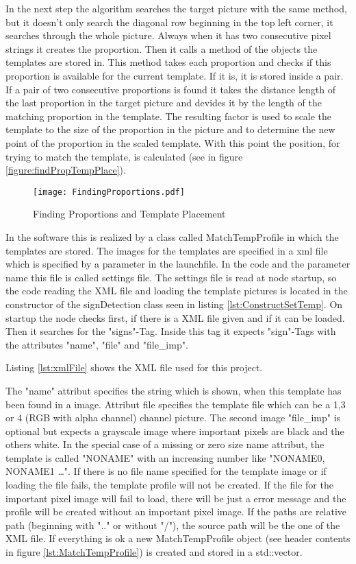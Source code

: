In the next step the algorithm searches the target picture with the same method, but
it doesn't only search the diagonal row beginning in the top left corner, it searches
through the whole picture. Always when it has two consecutive pixel strings it
creates the proportion. Then it calls a method of the objects the templates are stored in.
This method takes each proportion and checks if this proportion is available for
the current template. If it is, it is stored inside a pair. If a pair of two
consecutive proportions is found it takes the distance length of the last
proportion in the target picture and devides it by the length of the matching proportion
in the template. The resulting factor is used to scale the template to the size of the
proportion in the picture and to determine the new point of the proportion in the scaled template.
With this point the position, for trying to match the template, is calculated 
(see in figure \vref{figure:findPropTempPlace}).

\begin{figure}[htp]
\begin{center}
  \texttt{[image: FindingProportions.pdf]}
  \caption{Finding Proportions and Template Placement}
  \label{figure:findPropTempPlace}
\end{center}
\end{figure} 

In the software this is realized by a class called MatchTempProfile in which the templates are stored.
The images for the templates are specified in a xml file which is specified by a parameter in the launchfile.
\newpage 
In the code and the parameter name this file is called settings file. The settings file is read at node startup,
so the code reading the XML file and loading the template pictures is located in the constructor of the
signDetection class seen in listing \vref{lst:ConstructSetTemp}. On startup the node checks first,
if there is a XML file given and if it can be loaded. Then it searches for the "signs"-Tag.
Inside this tag it expects "sign"-Tags with the attributes "name", "file" and "file\_imp".

Listing \vref{lst:xmlFile} shows the XML file used for this project.

The "name" attribut specifies the string which is shown, when this template has been found in a image.
Attribut file specifies the template file which can be a 1,3 or 4 (RGB with alpha channel) channel picture. 
The second image "file\_imp" is optional but expects a grayscale image where important pixels are black and the others 
white. In the special case of a missing or zero size name attribut, the template is called "NONAME" with an increasing number
like "NONAME0, NONAME1 \ldots". If there is no file name specified for the template image or if loading the file
fails, the template profile will not be created. If the file for the important pixel image will fail to load, there will
be just a error message and the profile will be created without an important pixel image. If the paths are relative path 
(beginning with ".." or without "/"), the source path will be the one of the XML file. If everything is ok a new 
MatchTempProfile object (see header contents in figure \vref{lst:MatchTempProfile}) is created and stored in a std::vector.

